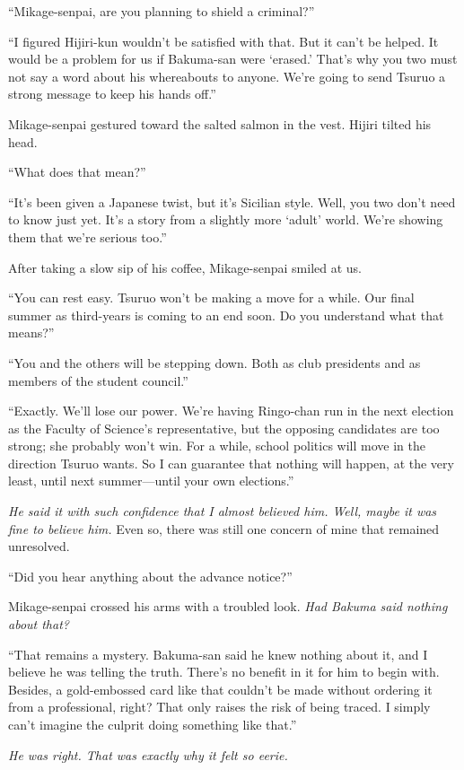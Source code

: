 \documentclass[
    a4paper,
    12pt,
    twoside,
    openany,
    UTF8,
    fontset=windows
]{ctexbook}
\begin{document}
``Mikage-senpai, are you planning to shield a criminal?''

``I figured Hijiri-kun wouldn't be satisfied with that. But it can't be helped. It would be a problem for us if Bakuma-san were `erased.' That's why you two must not say a word about his whereabouts to anyone. We're going to send Tsuruo a strong message to keep his hands off.''

Mikage-senpai gestured toward the salted salmon in the vest. Hijiri tilted his head.

``What does that mean?''

``It's been given a Japanese twist, but it's Sicilian style. Well, you two don't need to know just yet. It's a story from a slightly more `adult' world. We're showing them that we're serious too.''

After taking a slow sip of his coffee, Mikage-senpai smiled at us.

``You can rest easy. Tsuruo won't be making a move for a while. Our final summer as third-years is coming to an end soon. Do you understand what that means?''

``You and the others will be stepping down. Both as club presidents and as members of the student council.''

``Exactly. We'll lose our power. We're having Ringo-chan run in the next election as the Faculty of Science's representative, but the opposing candidates are too strong; she probably won't win. For a while, school politics will move in the direction Tsuruo wants. So I can guarantee that nothing will happen, at the very least, until next summer---until your own elections.''

\textit{He said it with such confidence that I almost believed him. Well, maybe it was fine to believe him.} Even so, there was still one concern of mine that remained unresolved.

``Did you hear anything about the advance notice?''

Mikage-senpai crossed his arms with a troubled look. \textit{Had Bakuma said nothing about that?}

``That remains a mystery. Bakuma-san said he knew nothing about it, and I believe he was telling the truth. There's no benefit in it for him to begin with. Besides, a gold-embossed card like that couldn't be made without ordering it from a professional, right? That only raises the risk of being traced. I simply can't imagine the culprit doing something like that.''

\textit{He was right. That was exactly why it felt so eerie.}
\end{document}
